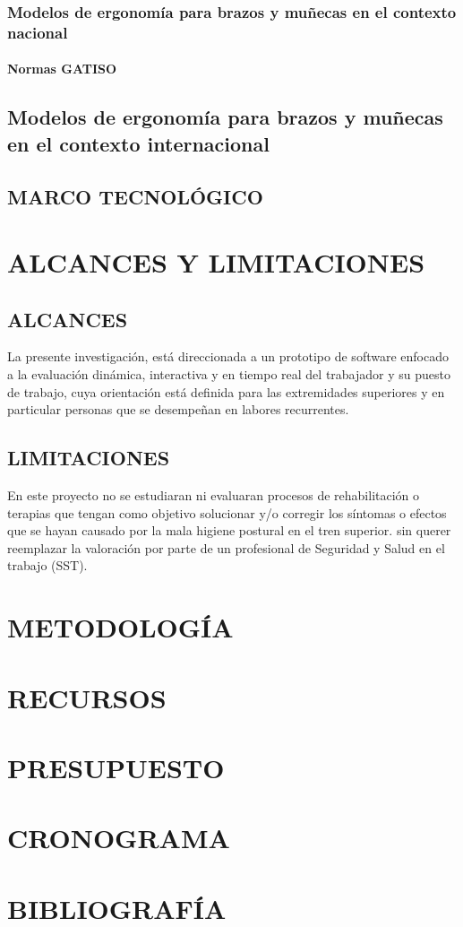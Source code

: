 \subsection{Modelos de ergonomía para brazos y muñecas en el contexto nacional}
\subsubsection{Normas GATISO}
\section{Modelos de ergonomía para brazos y muñecas en el contexto internacional}
\section{MARCO TECNOLÓGICO}
\chapter{ALCANCES Y LIMITACIONES}
\section{ALCANCES}
La presente investigación, está direccionada a un prototipo de software enfocado a  la evaluación dinámica, interactiva y  en tiempo real del trabajador y su puesto de trabajo, cuya orientación está definida para las extremidades superiores y en particular personas que se desempeñan en labores recurrentes. 
\section{LIMITACIONES}
En este proyecto no se estudiaran ni evaluaran procesos de rehabilitación o terapias que tengan como objetivo solucionar y/o corregir los síntomas o efectos que se hayan causado por la mala higiene postural en el tren superior. sin querer reemplazar la valoración por parte de un profesional de Seguridad y Salud en el trabajo (SST).
\chapter{METODOLOGÍA}
\chapter{RECURSOS}
\chapter{PRESUPUESTO}
\chapter{CRONOGRAMA}



\chapter{BIBLIOGRAFÍA}
	\newpage

	\printbibliography[heading=bibintoc, title={BIBLIOGRAFÍA}]
    
